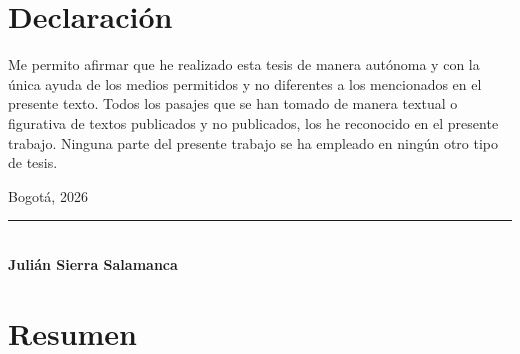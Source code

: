 \documentclass[12pt,letterpaper,twoside]{book}
\begin{document}
\chapter*{Declaración}
Me permito afirmar que he realizado esta tesis de manera autónoma y con la única ayuda de los medios permitidos y no diferentes a los mencionados en el presente texto. Todos los pasajes que se han tomado de manera textual o figurativa de textos publicados y no publicados, los he reconocido en el presente trabajo. Ninguna parte del presente trabajo se ha empleado en ningún otro tipo de tesis.
\vspace{2cm}\par
\noindent Bogotá, 2026 \par
\vspace{2.5cm}
\noindent\rule{7cm}{0.4pt}\\
\noindent \textbf{Julián Sierra Salamanca}

\chapter*{Resumen}

\tableofcontents
\listoffigures
\listoftables

\mainmatter
\end{document}
